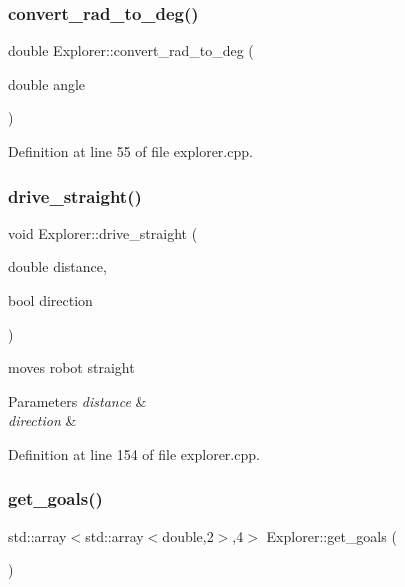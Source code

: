 \subsubsection{\texorpdfstring{convert\+\_\+rad\+\_\+to\+\_\+deg()}{convert\_rad\_to\_deg()}}
{\footnotesize\ttfamily double Explorer\+::convert\+\_\+rad\+\_\+to\+\_\+deg (\begin{DoxyParamCaption}\item[{double}]{angle }\end{DoxyParamCaption})}



Definition at line 55 of file explorer.\+cpp.

\mbox{\label{class_explorer_ab4ca9f16c48a60fc4d0e426b6fd9e9a0}} 
\subsubsection{\texorpdfstring{drive\+\_\+straight()}{drive\_straight()}}
{\footnotesize\ttfamily void Explorer\+::drive\+\_\+straight (\begin{DoxyParamCaption}\item[{double}]{distance,  }\item[{bool}]{direction }\end{DoxyParamCaption})}



moves robot straight 


\begin{DoxyParams}{Parameters}
{\em distance} & \\
\hline
{\em direction} & \\
\hline
\end{DoxyParams}


Definition at line 154 of file explorer.\+cpp.

\mbox{\label{class_explorer_a847e3ad2e7233d493a8dcfdd7139cb58}} 
\subsubsection{\texorpdfstring{get\+\_\+goals()}{get\_goals()}}
{\footnotesize\ttfamily std\+::array$<$std\+::array$<$double,2$>$,4$>$ Explorer\+::get\+\_\+goals (\begin{DoxyParamCaption}{ }\end{DoxyParamCaption})\hspace{0.3cm}{\ttfamily [inline]}}



